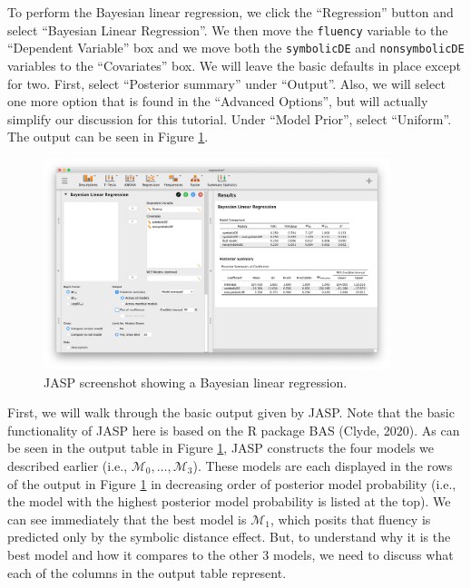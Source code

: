 \documentclass[english,,doc,floatsintext]{apa6}
\begin{document}
To perform the Bayesian linear regression, we click the \enquote{Regression} button and select \enquote{Bayesian Linear Regression}. We then move the \texttt{fluency} variable to the \enquote{Dependent Variable} box and we move both the \texttt{symbolicDE} and \texttt{nonsymbolicDE} variables to the \enquote{Covariates} box. We will leave the basic defaults in place except for two. First, select \enquote{Posterior summary} under \enquote{Output}. Also, we will select one more option that is found in the \enquote{Advanced Options}, but will actually simplify our discussion for this tutorial. Under \enquote{Model Prior}, select \enquote{Uniform}. The output can be seen in Figure \ref{fig:regression1}.

\begin{figure}
\centering
\includegraphics[width=0.9\textwidth,height=\textheight]{figures/regression1.png}
\caption{\label{fig:regression1}JASP screenshot showing a Bayesian linear regression.}
\end{figure}

First, we will walk through the basic output given by JASP. Note that the basic functionality of JASP here is based on the R package BAS (Clyde, 2020). As can be seen in the output table in Figure \ref{fig:regression1}, JASP constructs the four models we described earlier (i.e., \(\mathcal{M}_0, \dots, \mathcal{M}_3\)). These models are each displayed in the rows of the output in Figure \ref{fig:regression1} in decreasing order of posterior model probability (i.e., the model with the highest posterior model probability is listed at the top). We can see immediately that the best model is \(\mathcal{M}_{1}\), which posits that fluency is predicted only by the symbolic distance effect. But, to understand why it is the best model and how it compares to the other 3 models, we need to discuss what each of the columns in the output table represent.
\end{document}
